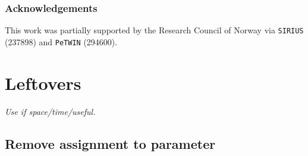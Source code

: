 \documentclass[runningheads]{llncs}
\begin{document}
\subsubsection*{Acknowledgements}
This work was partially supported by the Research Council of Norway via \texttt{SIRIUS} (237898) and \texttt{PeTWIN} (294600).
%

\section{Leftovers}
\textit{Use if space/time/useful.}
\subsection{Remove assignment to parameter}




\end{document}
